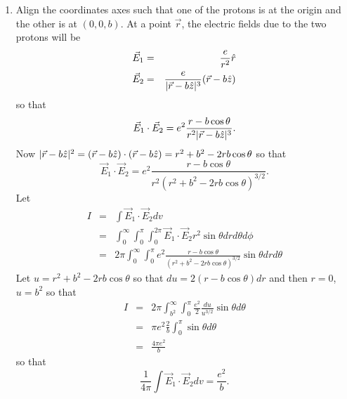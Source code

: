 \documentclass{article}
\begin{document}
\begin{enumerate}
\item Align the coordinates axes such that one of the protons is at the origin
and the other is at $(0, 0, b)$. At a point $\vec{r}$, the electric fields due
to the two protons will be
\begin{eqnarray*}
\vec{E}_1 &=& \frac{e}{r^2}\hat{r} \\
\vec{E}_2 &=& \frac{e}{|\vec{r} - b\hat{z}|^3}(\vec{r} - b\hat{z})
\end{eqnarray*}
so that
\[
\vec{E}_1\cdot\vec{E}_2 = e^2\frac{r - b\cos\theta}{r^2|\vec{r} - b\hat{z}|^3}.
\]
Now $|\vec{r} - b\hat{z}|^2 = (\vec{r} - b\hat{z})\cdot(\vec{r} - b\hat{z}) = r^2 + 
b^2 - 2rb\cos\theta$ so that
\[
\vec{E}_1\cdot\vec{E}_2 = e^2\frac{r - b\cos\theta}{r^2(r^2 + b^2 - 2rb\cos\theta)^{3/2}}.
\]
Let
\begin{eqnarray*}
I &=& \int \vec{E}_1\cdot\vec{E}_2 dv \\
  &=& \int_0^\infty\int_0^{\pi}\int_0^{2\pi}\vec{E}_1\cdot\vec{E}_2 r^2\sin\theta drd\theta d\phi \\
  &=& 2\pi\int_0^\infty\int_0^\pi e^2\frac{r - b\cos\theta}{(r^2 + b^2 - 2rb\cos\theta)^{3/2}}\sin\theta drd\theta
\end{eqnarray*}
Let $u = r^2 + b^2 - 2rb\cos\theta$ so that $du = 2(r - b\cos\theta)dr$ and then $r=0$, $u=b^2$ so that
\begin{eqnarray*}
I &=& 2\pi\int_{b^2}^\infty \int_0^\pi \frac{e^2}{2}\frac{du}{u^{3/2}} \sin\theta d\theta \\
  &=& \pi e^2 \frac{2}{b}\int_0^\pi \sin\theta d\theta \\
  &=& \frac{4\pi e^2}{b}
\end{eqnarray*}
so that 
\[
\frac{1}{4\pi}\int \vec{E}_1\cdot\vec{E}_2 dv = \frac{e^2}{b}.
\]
\end{enumerate}
\end{document}
